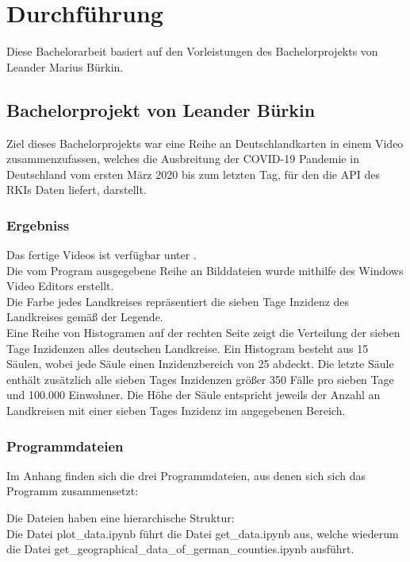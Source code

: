 \chapter{Durchführung}\label{chap:Durchführung}
Diese Bachelorarbeit basiert auf den Vorleistungen des Bachelorprojekts von Leander Marius Bürkin.



\section{Bachelorprojekt von Leander Bürkin}
Ziel dieses Bachelorprojekts war eine Reihe an Deutschlandkarten in einem Video zusammenzufassen, welches die Ausbreitung der COVID-19 Pandemie in Deutschland vom ersten März 2020 bis zum letzten Tag, für den die API des RKIs Daten liefert, darstellt.

\subsection{Ergebniss}
Das fertige Videos ist verfügbar unter .\\
Die vom Program ausgegebene Reihe an Bilddateien wurde mithilfe des Windows Video Editors erstellt.
\\
Die Farbe jedes Landkreises repräsentiert die sieben Tage Inzidenz des Landkreises gemäß der Legende.\\
Eine Reihe von Histogramen auf der rechten Seite zeigt die Verteilung der sieben Tage Inzidenzen alles deutschen Landkreise. Ein Histogram besteht aus 15 Säulen, wobei jede Säule einen Inzidenzbereich von 25 abdeckt. Die letzte Säule enthält zusätzlich alle sieben Tages Inzidenzen größer 350 Fälle pro sieben Tage und 100.000 Einwohner. Die Höhe der Säule entspricht jeweils der Anzahl an Landkreisen mit einer sieben Tages Inzidenz im angegebenen Bereich.

\subsection{Programmdateien}
Im Anhang finden sich die drei Programmdateien, aus denen sich sich das Programm zusammensetzt: 

Die Dateien haben eine hierarchische Struktur:\\
Die Datei \glqq{}plot\_data.ipynb\grqq{} führt die Datei \glqq{}get\_data.ipynb\grqq{} aus,
welche wiederum die Datei \glqq{}get\_geographical\_data\_of\_german\_counties.ipynb\grqq{} ausführt.

